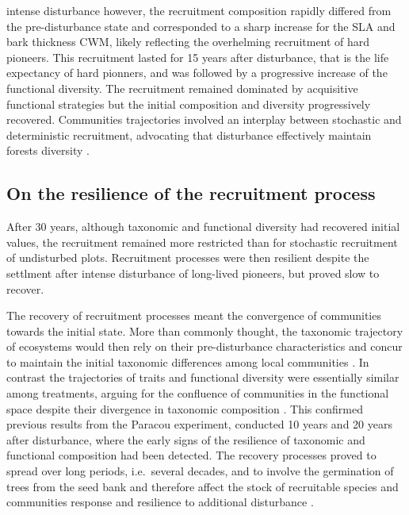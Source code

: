 \documentclass[fleqn,10pt]{ArtEcoFoG} %
\begin{document}
intense disturbance however, the recruitment composition rapidly
differed from the pre-disturbance state and corresponded to a sharp
increase for the SLA and bark thickness CWM, likely reflecting the
overhelming recruitment of hard pioneers. This recruitment lasted for 15
years after disturbance, that is the life expectancy of hard pionners,
and was followed by a progressive increase of the functional diversity.
The recruitment remained dominated by acquisitive functional strategies
but the initial composition and diversity progressively recovered.
Communities trajectories involved an interplay between stochastic and
deterministic recruitment, advocating that disturbance effectively
maintain forests diversity \citep{Molino2001, Sheil2003}.

\subsection{On the resilience of the recruitment
process}\label{on-the-resilience-of-the-recruitment-process}

After 30 years, although taxonomic and functional diversity had
recovered initial values, the recruitment remained more restricted than
for stochastic recruitment of undisturbed plots. Recruitment processes
were then resilient despite the settlment after intense disturbance of
long-lived pioneers, but proved slow to recover.

The recovery of recruitment processes meant the convergence of
communities towards the initial state. More than commonly thought, the
taxonomic trajectory of ecosystems would then rely on their
pre-disturbance characteristics and concur to maintain the initial
taxonomic differences among local communities \citep{Anderson200}. In
contrast the trajectories of traits and functional diversity were
essentially similar among treatments, arguing for the confluence of
communities in the functional space despite their divergence in
taxonomic composition \citep{Fukami2005}. This confirmed previous
results from the Paracou experiment, conducted 10 years
\citep{Molino2001} and 20 years \citep{Baraloto2012a} after disturbance,
where the early signs of the resilience of taxonomic and functional
composition had been detected. The recovery processes proved to spread
over long periods, i.e.~several decades, and to involve the germination
of trees from the seed bank and therefore affect the stock of
recruitable species and communities response and resilience to
additional disturbance \citep{Norden2009}.
\end{document}
